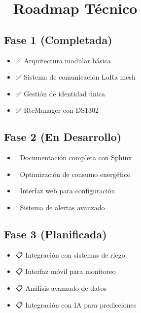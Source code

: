 \documentclass[a4paper,11pt,spanish]{sphinxmanual}
\begin{document}
\chapter{🔮 Roadmap Técnico}
\label{\detokenize{index:roadmap-tecnico}}

\section{Fase 1 (Completada)}
\label{\detokenize{index:fase-1-completada}}\begin{itemize}
\item {} 
\sphinxAtStartPar
✅ Arquitectura modular básica

\item {} 
\sphinxAtStartPar
✅ Sistema de comunicación LoRa mesh

\item {} 
\sphinxAtStartPar
✅ Gestión de identidad única

\item {} 
\sphinxAtStartPar
✅ RtcManager con DS1302

\end{itemize}


\section{Fase 2 (En Desarrollo)}
\label{\detokenize{index:fase-2-en-desarrollo}}\begin{itemize}
\item {} 
\sphinxAtStartPar
🔄 Documentación completa con Sphinx

\item {} 
\sphinxAtStartPar
🔄 Optimización de consumo energético

\item {} 
\sphinxAtStartPar
🔄 Interfaz web para configuración

\item {} 
\sphinxAtStartPar
🔄 Sistema de alertas avanzado

\end{itemize}


\section{Fase 3 (Planificada)}
\label{\detokenize{index:fase-3-planificada}}\begin{itemize}
\item {} 
\sphinxAtStartPar
📋 Integración con sistemas de riego

\item {} 
\sphinxAtStartPar
📋 Interfaz móvil para monitoreo

\item {} 
\sphinxAtStartPar
📋 Análisis avanzado de datos

\item {} 
\sphinxAtStartPar
📋 Integración con IA para predicciones

\end{itemize}
\end{document}
